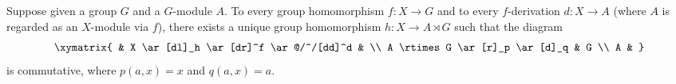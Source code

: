 Suppose given a group $G$ and a $G$-module $A$. To every group homomorphism $f : X \to G$ and to every $f$-derivation $d : X \to A$ (where $A$ is regarded as an $X$-module via $f$), there exists a unique group homomorphism $h : X \to A \rtimes G$ such that the diagram
$$\xymatrix{
& X \ar[dl]_h \ar[dr]^f \ar@/^/[dd]^d & \\
A \rtimes G \ar[r]_p \ar[d]_q & G \\
A &
}$$
is commutative, where $p(a,x) = x$ and $q(a,x) = a$.

